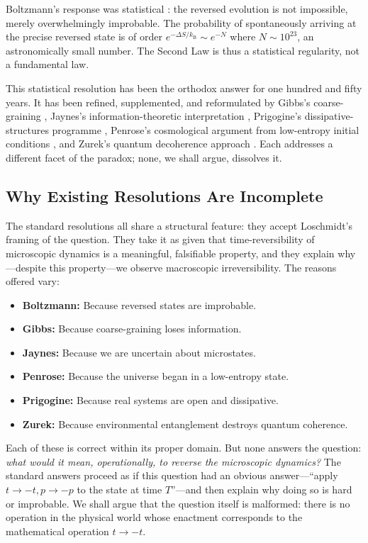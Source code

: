 \documentclass[twocolumn,10pt,a4paper]{article}
\theoremstyle{definition}
\theoremstyle{remark}
\newcommand{\kB}{k_{\mathrm{B}}}
\begin{document}
Boltzmann's response was statistical \citep{boltzmann1877}: the reversed evolution is not impossible, merely overwhelmingly improbable. The probability of spontaneously arriving at the precise reversed state is of order $e^{-\Delta S/\kB} \sim e^{-N}$ where $N \sim 10^{23}$, an astronomically small number. The Second Law is thus a statistical regularity, not a fundamental law.

This statistical resolution has been the orthodox answer for one hundred and fifty years. It has been refined, supplemented, and reformulated by Gibbs's coarse-graining \citep{gibbs1902}, Jaynes's information-theoretic interpretation \citep{jaynes1957}, Prigogine's dissipative-structures programme \citep{prigogine1977}, Penrose's cosmological argument from low-entropy initial conditions \citep{penrose1989,penrose2004}, and Zurek's quantum decoherence approach \citep{zurek1991,zurek2003}. Each addresses a different facet of the paradox; none, we shall argue, dissolves it.

\subsection{Why Existing Resolutions Are Incomplete}

The standard resolutions all share a structural feature: they accept Loschmidt's framing of the question. They take it as given that time-reversibility of microscopic dynamics is a meaningful, falsifiable property, and they explain why---despite this property---we observe macroscopic irreversibility. The reasons offered vary:

\begin{itemize}[leftmargin=1.2em,itemsep=0.2em]
    \item \textbf{Boltzmann:} Because reversed states are improbable.
    \item \textbf{Gibbs:} Because coarse-graining loses information.
    \item \textbf{Jaynes:} Because we are uncertain about microstates.
    \item \textbf{Penrose:} Because the universe began in a low-entropy state.
    \item \textbf{Prigogine:} Because real systems are open and dissipative.
    \item \textbf{Zurek:} Because environmental entanglement destroys quantum coherence.
\end{itemize}

Each of these is correct within its proper domain. But none answers the question: \emph{what would it mean, operationally, to reverse the microscopic dynamics?} The standard answers proceed as if this question had an obvious answer---``apply $t \to -t, p \to -p$ to the state at time $T$''---and then explain why doing so is hard or improbable. We shall argue that the question itself is malformed: there is no operation in the physical world whose enactment corresponds to the mathematical operation $t \to -t$.
\end{document}
